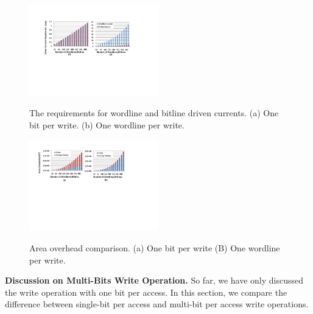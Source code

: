 \begin{figure}%
\centering
  \includegraphics[width=0.5\textwidth]{./figures/drive_i_f.pdf}\\
  \caption{The requirements for wordline and bitline driven currents. (a) One bit per write. (b) One wordline per write.}\label{fig:drive_i}
\end{figure}



\begin{figure}%
\centering
  \includegraphics[width=0.5\textwidth]{./figures/area_comp_f.pdf}\\
  \caption{Area overhead comparison. (a) One bit per write (B) One wordline per write.}\label{fig:area_i}
\vspace{-10pt}
\end{figure}

\vspace{5pt}\noindent\textbf{Discussion on Multi-Bits Write Operation.} %
%
So far, we have only discussed the write operation with one bit per
access. In this section, we compare the difference between single-bit per
access and multi-bit per access write operations.

